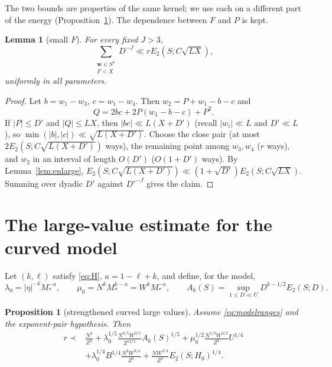 \documentclass[11pt]{amsart}
\newtheorem{proposition}[theorem]{Proposition}
\newtheorem{lemma}[theorem]{Lemma}
\theoremstyle{definition}
\theoremstyle{remark}
\numberwithin{equation}{section}
\newcommand{\Mst}{M_{*}}
\begin{document}
The two bounds are properties of the same kernel; we use each on a different part of the energy (Proposition~\ref{prop:model}). The dependence between $F$ and $P$ is kept.

\begin{lemma}[small $F$]\label{lem:smallF}
For every fixed $J>3$,
\[
\sum_{\substack{\mathbf w\in S^4\\ F<X}}D^{-J}\ll rE_2(S;C\sqrt{LX}),
\]
uniformly in all parameters.
\end{lemma}

\begin{proof}
Let $b=w_1-w_3$, $c=w_1-w_4$. Then $w_2=P+w_1-b-c$ and
\[
Q=2bc+2P(w_1-b-c)+P^2 .
\]
If $|P|\le D'$ and $|Q|\le LX$, then $|bc|\ll L(X+D')$ (recall $|w_i|\ll L$ and $D'\ll L$), so $\min(|b|,|c|)\ll\sqrt{L(X+D')}$. Choose the close pair (at most $2E_2(S;C\sqrt{L(X+D')})$ ways), the remaining point among $w_3,w_4$ ($r$ ways), and $w_2$ in an interval of length $O(D')$ ($O(1+D')$ ways). By Lemma~\ref{lem:enlarge}, $E_2(S;C\sqrt{L(X+D')})\ll(1+\sqrt{D'})E_2(S;C\sqrt{LX})$. Summing over dyadic $D'$ against $D'^{-J}$ gives the claim.
\end{proof}

\section{The large-value estimate for the curved model}\label{sec:model}

Let $(k,\ell)$ satisfy \eqref{eq:H}, $a=1-\ell+k$, and define, for the model,
\[
\lambda_0=|\eta|^{-k}\Mst^{-a},\qquad \mu_0=N^{k}\Mst^{k-a}=W^{k}\Mst^{-a},\qquad
A_k(S)=\sup_{1\le D\ll U}D^{k-1/2}E_2(S;D).
\]

\begin{proposition}[strengthened curved large values]\label{prop:model}
Assume \eqref{eq:modelranges} and the exponent-pair hypothesis. Then
\begin{equation}\label{eq:modelbound}
\begin{aligned}
r\prec{}&\frac{N^2}{Z^2}
+\lambda_0^{1/5}\frac{N^{8/5}W^{3/5}}{Z^{12/5}}A_k(S)^{1/5}
+\mu_0^{1/2}\frac{N^{5/2}W^{3/2}}{Z^5}U^{1/4}\\
&+\lambda_0^{1/4}B^{1/4}\frac{N^2W^{3/4}}{Z^3}
+\frac{NW^{3/4}}{Z^2}E_2(S;H_0)^{1/4}.
\end{aligned}
\end{equation}
\end{proposition}
\end{document}
